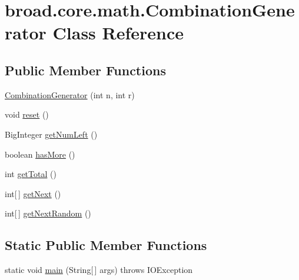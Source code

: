 \hypertarget{classbroad_1_1core_1_1math_1_1_combination_generator}{\section{broad.\+core.\+math.\+Combination\+Generator Class Reference}
\label{classbroad_1_1core_1_1math_1_1_combination_generator}
}
\subsection*{Public Member Functions}
\begin{DoxyCompactItemize}
\item 
\hyperlink{classbroad_1_1core_1_1math_1_1_combination_generator_a239cddbdffdb62bbff5c0e5f5fd43ac3}{Combination\+Generator} (int n, int r)
\item 
void \hyperlink{classbroad_1_1core_1_1math_1_1_combination_generator_ab0800095bb09f1afc1dc75c8ae478ed3}{reset} ()
\item 
Big\+Integer \hyperlink{classbroad_1_1core_1_1math_1_1_combination_generator_aa4cbe2046427cc15d0418d9cedc366fc}{get\+Num\+Left} ()
\item 
boolean \hyperlink{classbroad_1_1core_1_1math_1_1_combination_generator_a3cb0303bdea7e5cd720f7ba8ef6a2f9b}{has\+More} ()
\item 
int \hyperlink{classbroad_1_1core_1_1math_1_1_combination_generator_a5c3b3f2855ca7ed1ceb85489d29d1ddb}{get\+Total} ()
\item 
int\mbox{[}$\,$\mbox{]} \hyperlink{classbroad_1_1core_1_1math_1_1_combination_generator_a7eff3bd69051ba5a14595b23b4dbe17b}{get\+Next} ()
\item 
int\mbox{[}$\,$\mbox{]} \hyperlink{classbroad_1_1core_1_1math_1_1_combination_generator_a7053a13f87f5b58a1a012214f21cc692}{get\+Next\+Random} ()
\end{DoxyCompactItemize}
\subsection*{Static Public Member Functions}
\begin{DoxyCompactItemize}
\item 
static void \hyperlink{classbroad_1_1core_1_1math_1_1_combination_generator_aac6651a64c2fc56baeae84f078fb6232}{main} (String\mbox{[}$\,$\mbox{]} args)  throws I\+O\+Exception
\end{DoxyCompactItemize}


